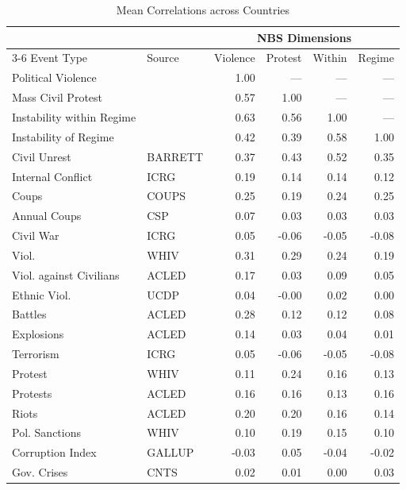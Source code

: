 \begin{table}[htbp]
\scriptsize
\centering
\caption{Mean Correlations across Countries}
\label{tab:mean_correlation_selected_events_ordered}
\begin{minipage}{0.7\linewidth}
\begin{tabular}{llrrrr}
\toprule
& & \multicolumn{4}{c}{NBS Dimensions} \\
\cmidrule(lr){3-6}
Event Type & Source & Violence & Protest & Within & Regime \\
\midrule
  Political Violence &  & 1.00 & --- & --- & --- \\ 
  Mass Civil Protest &  & 0.57 & 1.00 & --- & --- \\ 
  Instability within Regime &  & 0.63 & 0.56 & 1.00 & --- \\ 
  Instability of Regime &  & 0.42 & 0.39 & 0.58 & 1.00 \\ 
  \midrule
  Civil Unrest & BARRETT & 0.37 & 0.43 & 0.52 & 0.35 \\ 
  Internal Conflict & ICRG & 0.19 & 0.14 & 0.14 & 0.12 \\ 
  Coups & COUPS & 0.25 & 0.19 & 0.24 & 0.25 \\ 
  Annual Coups & CSP & 0.07 & 0.03 & 0.03 & 0.03 \\ 
  Civil War & ICRG & 0.05 & -0.06 & -0.05 & -0.08 \\ 
  Viol. & WHIV & 0.31 & 0.29 & 0.24 & 0.19 \\ 
  Viol. against Civilians & ACLED & 0.17 & 0.03 & 0.09 & 0.05 \\ 
  Ethnic Viol. & UCDP & 0.04 & -0.00 & 0.02 & 0.00 \\ 
  Battles & ACLED & 0.28 & 0.12 & 0.12 & 0.08 \\ 
  Explosions & ACLED & 0.14 & 0.03 & 0.04 & 0.01 \\ 
  Terrorism & ICRG & 0.05 & -0.06 & -0.05 & -0.08 \\ 
  Protest & WHIV & 0.11 & 0.24 & 0.16 & 0.13 \\ 
  Protests & ACLED & 0.16 & 0.16 & 0.13 & 0.16 \\ 
  Riots & ACLED & 0.20 & 0.20 & 0.16 & 0.14 \\ 
  Pol. Sanctions & WHIV & 0.10 & 0.19 & 0.15 & 0.10 \\ 
  Corruption Index & GALLUP & -0.03 & 0.05 & -0.04 & -0.02 \\ 
  Gov. Crises & CNTS & 0.02 & 0.01 & 0.00 & 0.03 \\ 

\end{tabular}
\end{minipage}
\end{table}
